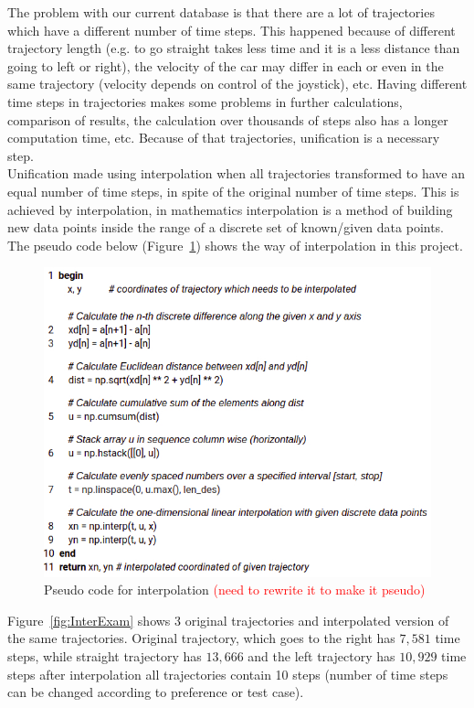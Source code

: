 The problem with our current database is that there are a lot of trajectories which have a different number of time steps. This happened because of different trajectory length (e.g. to go straight takes less time and it is a less distance than going to left or right), the velocity of the car may differ in each or even in the same trajectory (velocity depends on control of the joystick), etc. Having different time steps in trajectories makes some problems in further calculations, comparison of results, the calculation over thousands of steps also has a longer computation time, etc. Because of that trajectories, unification is a necessary step. \\
Unification made using interpolation when all trajectories transformed to have an equal number of time steps, in spite of the original number of time steps. This is achieved by interpolation, in mathematics interpolation is a method of building new data points inside the range of a discrete set of known/given data points. \\

The pseudo code below (Figure~\ref{fig:pseudoInter}) shows the way of interpolation in this project.

\begin{figure}[h]
	\centering  	
	\includegraphics[width=13cm]{img/interpolation.jpg}
	\caption{Pseudo code for interpolation \textcolor{red}{(need to rewrite it to make it pseudo)}}
	\label{fig:pseudoInter}    
\end{figure}

Figure~\ref{fig:InterExam} shows 3 original trajectories and interpolated version of the same trajectories. Original trajectory, which goes to the right has $7,581$ time steps, while straight trajectory has $13,666$ and the left trajectory has $10,929$ time steps after interpolation all trajectories contain 10 steps (number of time steps can be changed according to preference or test case).

